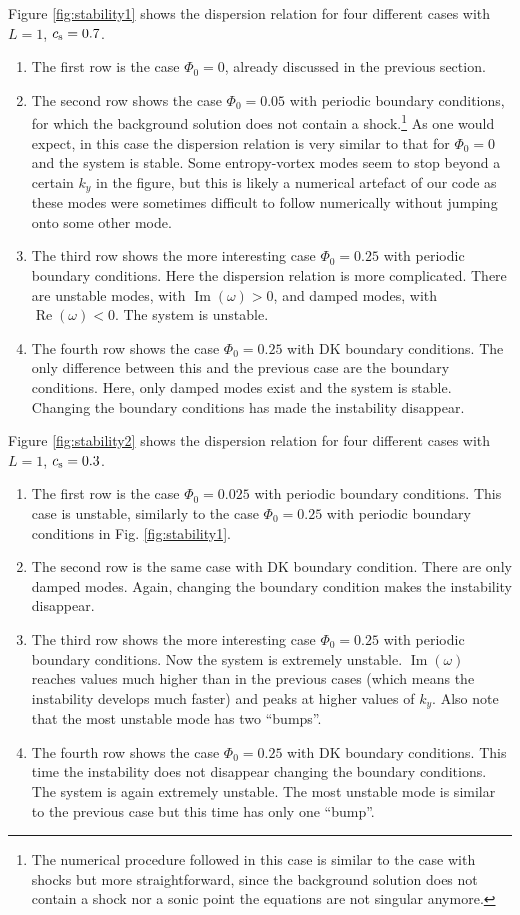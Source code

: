 \documentclass[useAMS,usenatbib]{mn2e}
\begin{document}
Figure \ref{fig:stability1} shows the dispersion relation for four different cases with $L=1$, $c_{\rm s}=0.7$. 
\begin{enumerate}
\item The first row is the case $\Phi_0=0$, already discussed in the previous section. 
\item The second row shows the case $\Phi_0=0.05$ with periodic boundary conditions, for which the background solution does not contain a shock.\footnote{The numerical procedure followed in this case is similar to the case with shocks but more straightforward, since the background solution does not contain a shock nor a sonic point the equations are not singular anymore.} As one would expect, in this case the dispersion relation is very similar to that for $\Phi_0=0$ and the system is stable. Some entropy-vortex modes seem to stop beyond a certain $k_y$ in the figure, but this is likely a numerical artefact of our code as these modes were sometimes difficult to follow numerically without jumping onto some other mode.
\item The third row shows the more interesting case $\Phi_0=0.25$ with periodic boundary conditions. Here the dispersion relation is more complicated. There are unstable modes, with $\operatorname{Im}(\omega)>0$, and damped modes, with $\operatorname{Re}(\omega)<0$. The system is unstable.
\item The fourth row shows the case $\Phi_0=0.25$ with DK boundary conditions. The only difference between this and the previous case are the boundary conditions. Here, only damped modes exist and the system is stable. Changing the boundary conditions has made the instability disappear.
\end{enumerate}

Figure \ref{fig:stability2} shows the dispersion relation for four different cases with $L=1$, $c_{\rm s}=0.3$. 
\begin{enumerate}
\item The first row is the case $\Phi_0=0.025$ with periodic boundary conditions. This case is unstable, similarly to the case $\Phi_0=0.25$ with periodic boundary conditions in Fig. \ref{fig:stability1}.
\item The second row is the same case with DK boundary condition. There are only damped modes. Again, changing the boundary condition makes the instability disappear.
\item The third row shows the more interesting case $\Phi_0=0.25$ with periodic boundary conditions. Now the system is extremely unstable. $\operatorname{Im}(\omega)$ reaches values much higher than in the previous cases (which means the instability develops much faster) and peaks at higher values of $k_y$. Also note that the most unstable mode has two ``bumps''.
\item The fourth row shows the case $\Phi_0=0.25$ with DK boundary conditions. This time the instability does not disappear changing the boundary conditions. The system is again extremely unstable. The most unstable mode is similar to the previous case but this time has only one ``bump''.
\end{enumerate}
\end{document}
